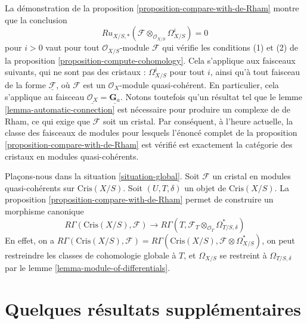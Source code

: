 \begin{remark}
\label{remark-vanishing}
La démonstration de la proposition \ref{proposition-compare-with-de-Rham}
montre que la conclusion
$$
Ru_{X/S, *}(\mathcal{F} \otimes_{\mathcal{O}_{X/S}} \Omega^i_{X/S}) = 0
$$
pour $i > 0$ vaut pour tout $\mathcal{O}_{X/S}$-module
$\mathcal{F}$ qui vérifie les conditions (1) et (2) de la
proposition \ref{proposition-compute-cohomology}.
Cela s'applique aux faisceaux suivants, qui ne sont pas des cristaux :
$\Omega^i_{X/S}$ pour tout $i$, ainsi qu'à tout faisceau de la forme
$\underline{\mathcal{F}}$, où $\mathcal{F}$ est un $\mathcal{O}_X$-module
quasi-cohérent. En particulier, cela s'applique au
faisceau $\underline{\mathcal{O}_X} = \underline{\mathbf{G}_a}$.
Notons toutefois qu'un résultat tel que le lemme \ref{lemma-automatic-connection}
est nécessaire pour produire un complexe de de Rham, ce qui exige que $\mathcal{F}$ soit un cristal.
Par conséquent, à l'heure actuelle, la classe des faisceaux de modules pour lesquels l'énoncé
complet de la proposition \ref{proposition-compare-with-de-Rham} est vérifié
est exactement la catégorie des cristaux en modules quasi-cohérents.
\end{remark}

\noindent
Plaçons-nous dans la situation \ref{situation-global}.
Soit $\mathcal{F}$ un cristal en modules quasi-cohérents sur
$\text{Cris}(X/S)$. Soit $(U, T, \delta)$ un objet de
$\text{Cris}(X/S)$. La proposition \ref{proposition-compare-with-de-Rham}
permet de construire un morphisme canonique
\begin{equation}
\label{equation-restriction}
R\Gamma(\text{Cris}(X/S), \mathcal{F})
\longrightarrow
R\Gamma(T, \mathcal{F}_T \otimes_{\mathcal{O}_T} \Omega^*_{T/S, \delta})
\end{equation}
En effet, on a $R\Gamma(\text{Cris}(X/S), \mathcal{F}) =
R\Gamma(\text{Cris}(X/S), \mathcal{F} \otimes \Omega^*_{X/S})$,
on peut restreindre les classes de cohomologie globale à $T$, et $\Omega_{X/S}$
se restreint à $\Omega_{T/S, \delta}$ par le
lemme \ref{lemma-module-of-differentials}.

















\section{Quelques résultats supplémentaires}
\label{section-missing}

